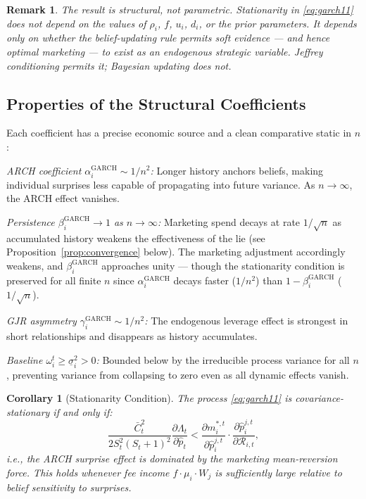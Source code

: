 \documentclass[12pt,a4paper]{article}
\newtheorem{corollary}{Corollary}
\newtheorem{remark}{Remark}
\newcommand{\1}{\mathbf{1}}
\begin{document}
\begin{remark}
The result is structural, not parametric. Stationarity in
\eqref{eq:garch11} does not depend on the values of $\rho_i$, $f$,
$u_i$, $d_i$, or the prior parameters. It depends only on whether
the belief-updating rule permits soft evidence --- and hence optimal
marketing --- to exist as an endogenous strategic variable. Jeffrey
conditioning permits it; Bayesian updating does not.
\end{remark}

\subsection{Properties of the Structural Coefficients}

Each coefficient has a precise economic source and a clean
comparative static in $n$:

\textit{ARCH coefficient $\alpha_i^{\mathrm{GARCH}} \sim 1/n^2$:}
Longer history anchors beliefs, making individual surprises less
capable of propagating into future variance. As $n \to \infty$,
the ARCH effect vanishes.

\textit{Persistence $\beta_i^{\mathrm{GARCH}} \to 1$ as $n \to \infty$:}
Marketing spend decays at rate $1/\sqrt{n}$ as accumulated history
weakens the effectiveness of the lie (see Proposition~\ref{prop:convergence}
below). The marketing adjustment accordingly weakens, and
$\beta_i^{\mathrm{GARCH}}$ approaches unity --- though the stationarity
condition is preserved for all finite $n$ since
$\alpha_i^{\mathrm{GARCH}}$ decays faster ($1/n^2$) than
$1 - \beta_i^{\mathrm{GARCH}}$ ($1/\sqrt{n}$).

\textit{GJR asymmetry $\gamma_i^{\mathrm{GARCH}} \sim 1/n^2$:}
The endogenous leverage effect is strongest in short relationships
and disappears as history accumulates.

\textit{Baseline $\omega_i^t \geq \underline{\sigma}_i^2 > 0$:}
Bounded below by the irreducible process variance for all $n$,
preventing variance from collapsing to zero even as all dynamic
effects vanish.

\begin{corollary}[Stationarity Condition]
\label{cor:stationarity}
The process \eqref{eq:garch11} is covariance-stationary if and only if:
\begin{equation}
  \frac{\bar{C}_t^2}{2S_t^2(S_t+1)^2}
  \frac{\partial\Lambda_t}{\partial\hat{p}_t}
  <
  \frac{\partial m_i^{*,t}}{\partial\hat{p}_i^{j,t}}
  \cdot
  \frac{\partial\hat{p}_i^{j,t}}{\partial\mathcal{R}_{i,t}},
  \label{eq:stationarity}
\end{equation}
i.e., the ARCH surprise effect is dominated by the marketing
mean-reversion force. This holds whenever fee income
$f \cdot \mu_i \cdot W_j$ is sufficiently large relative to
belief sensitivity to surprises.
\end{corollary}
\end{document}

